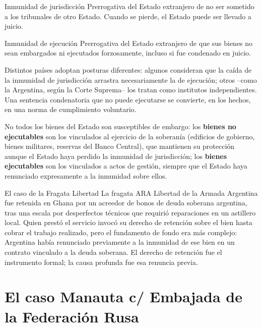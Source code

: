 \documentclass[12pt,oneside]{book}
\begin{document}
\begin{definicion}{Inmunidad de jurisdicción}
Prerrogativa del Estado extranjero de no ser sometido a los tribunales de otro Estado. Cuando se pierde, el Estado puede ser llevado a juicio.
\end{definicion}

\begin{definicion}{Inmunidad de ejecución}
Prerrogativa del Estado extranjero de que sus bienes no sean embargados ni ejecutados forzosamente, incluso si fue condenado en juicio.
\end{definicion}

\begin{importante}
Distintos países adoptan posturas diferentes: algunos consideran que la caída de la inmunidad de jurisdicción arrastra necesariamente la de ejecución; otros --como la Argentina, según la Corte Suprema-- los tratan como institutos independientes. Una sentencia condenatoria que no puede ejecutarse se convierte, en los hechos, en una norma de cumplimiento voluntario.
\end{importante}

No todos los bienes del Estado son susceptibles de embargo: los \textbf{bienes no ejecutables} son los vinculados al ejercicio de la soberanía (edificios de gobierno, bienes militares, reservas del Banco Central), que mantienen su protección aunque el Estado haya perdido la inmunidad de jurisdicción; los \textbf{bienes ejecutables} son los vinculados a actos de gestión, siempre que el Estado haya renunciado expresamente a la inmunidad sobre ellos.

\begin{ejemplo}{El caso de la Fragata Libertad}
La fragata ARA Libertad de la Armada Argentina fue retenida en Ghana por un acreedor de bonos de deuda soberana argentina, tras una escala por desperfectos técnicos que requirió reparaciones en un astillero local. Quien prestó el servicio invocó su derecho de retención sobre el bien hasta cobrar el trabajo realizado, pero el fundamento de fondo era más complejo: Argentina había renunciado previamente a la inmunidad de ese bien en un contrato vinculado a la deuda soberana. El derecho de retención fue el instrumento formal; la causa profunda fue esa renuncia previa.
\end{ejemplo}

\section{El caso Manauta c/ Embajada de la Federación Rusa}
\end{document}

